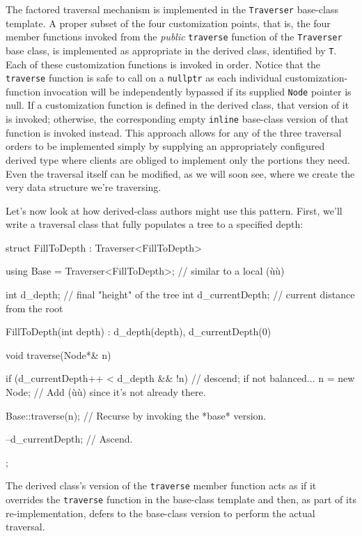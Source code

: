 \noindent The factored traversal mechanism is implemented in the
\lstinline!Traverser! base-class template. A proper subset of the four
customization points, that is, the four member functions invoked from
the \emph{public} \lstinline!traverse! function of the \lstinline!Traverser!
base class, is implemented as appropriate in the derived class,
identified by \lstinline!T!. Each of these customization functions is
invoked in order. Notice that the \lstinline!traverse! function is safe to call on a
\lstinline!nullptr! as each individual customization-function invocation
will be independently bypassed if its supplied \lstinline!Node! pointer is
null. If a customization function is defined in the derived class, that
version of it is invoked; otherwise, the corresponding empty
\lstinline!inline! base-class version of that function is invoked instead.
This approach allows for any of the three traversal orders to be
implemented simply by supplying an appropriately configured derived type
where clients are obliged to implement only the portions they need. Even
the traversal itself can be modified, as we will soon see, where we
create the very data structure we're traversing.

Let's now look at how derived-class authors might use this pattern.
First, we'll write a traversal class that fully populates a tree to a
specified depth:

\begin{emcppslisting}[emcppsbatch=e9]
struct FillToDepth : Traverser<FillToDepth>
{
    using Base = Traverser<FillToDepth>;  // similar to a local (ù{}ù)

    int d_depth;            //  final "height" of the tree
    int d_currentDepth;     //  current distance from the root

    FillToDepth(int depth) : d_depth(depth), d_currentDepth(0) { }

    void traverse(Node*& n)
    {
        if (d_currentDepth++ < d_depth && !n)  // descend; if not balanced...
        {
            n = new Node;     // Add (ù{}ù) since it's not already there.
        }

        Base::traverse(n);    // Recurse by invoking the *base* version.

        --d_currentDepth;     // Ascend.
    }
};
\end{emcppslisting}
    
\noindent The derived class's version of the \lstinline!traverse! member function
acts as if it overrides the \lstinline!traverse! function in the base-class
template and then, as part of its re-implementation, defers to the base-class version to perform the actual traversal.

